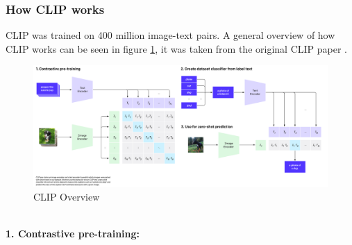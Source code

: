 \documentclass[a4paper,11pt,oneside]{article}
\begin{document}
  \subsubsection{How CLIP works}
  CLIP was trained on 400 million image-text pairs. A general overview of how CLIP works can be seen in figure \ref{fig:clip_overview}, it was taken from the original CLIP paper \cite{radford2021learning}.
  \begin{figure}[h]
  	\centering
  	\includegraphics[width=\textwidth]{figures/clip_overview.png}
  	\caption{CLIP Overview \cite{radford2021learning}}
  	\label{fig:clip_overview}
  \end{figure}
  \\
  \textbf{1. Contrastive pre-training:}
  \\
\end{document}
